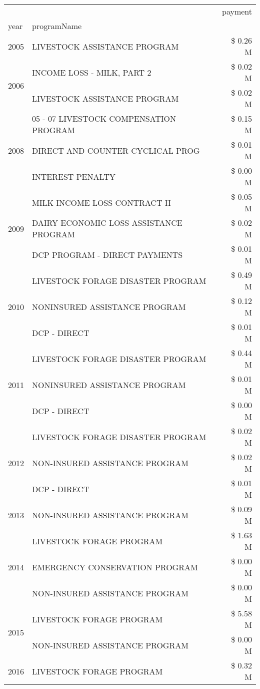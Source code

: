 \begin{tabular}{llr}
\toprule
 &  & payment \\
year & programName &  \\
\midrule
2005 & LIVESTOCK ASSISTANCE PROGRAM & \$ 0.26 M \\
\cline{1-3}
\multirow[t]{2}{*}{2006} & INCOME LOSS - MILK, PART 2 & \$ 0.02 M \\
 & LIVESTOCK ASSISTANCE PROGRAM & \$ 0.02 M \\
\cline{1-3}
\multirow[t]{3}{*}{2008} & 05 - 07 LIVESTOCK COMPENSATION PROGRAM & \$ 0.15 M \\
 & DIRECT AND COUNTER CYCLICAL PROG & \$ 0.01 M \\
 & INTEREST PENALTY & \$ 0.00 M \\
\cline{1-3}
\multirow[t]{3}{*}{2009} & MILK INCOME LOSS CONTRACT II & \$ 0.05 M \\
 & DAIRY ECONOMIC LOSS ASSISTANCE PROGRAM & \$ 0.02 M \\
 & DCP PROGRAM - DIRECT PAYMENTS & \$ 0.01 M \\
\cline{1-3}
\multirow[t]{3}{*}{2010} & LIVESTOCK FORAGE DISASTER PROGRAM & \$ 0.49 M \\
 & NONINSURED ASSISTANCE PROGRAM & \$ 0.12 M \\
 & DCP - DIRECT & \$ 0.01 M \\
\cline{1-3}
\multirow[t]{3}{*}{2011} & LIVESTOCK FORAGE DISASTER PROGRAM & \$ 0.44 M \\
 & NONINSURED ASSISTANCE PROGRAM & \$ 0.01 M \\
 & DCP - DIRECT & \$ 0.00 M \\
\cline{1-3}
\multirow[t]{3}{*}{2012} & LIVESTOCK FORAGE DISASTER PROGRAM & \$ 0.02 M \\
 & NON-INSURED ASSISTANCE PROGRAM & \$ 0.02 M \\
 & DCP - DIRECT & \$ 0.01 M \\
\cline{1-3}
2013 & NON-INSURED ASSISTANCE PROGRAM & \$ 0.09 M \\
\cline{1-3}
\multirow[t]{3}{*}{2014} & LIVESTOCK FORAGE PROGRAM & \$ 1.63 M \\
 & EMERGENCY CONSERVATION PROGRAM & \$ 0.00 M \\
 & NON-INSURED ASSISTANCE PROGRAM & \$ 0.00 M \\
\cline{1-3}
\multirow[t]{2}{*}{2015} & LIVESTOCK FORAGE PROGRAM & \$ 5.58 M \\
 & NON-INSURED ASSISTANCE PROGRAM & \$ 0.00 M \\
\cline{1-3}
\multirow[t]{2}{*}{2016} & LIVESTOCK FORAGE PROGRAM & \$ 0.32 M \\

\end{tabular}
